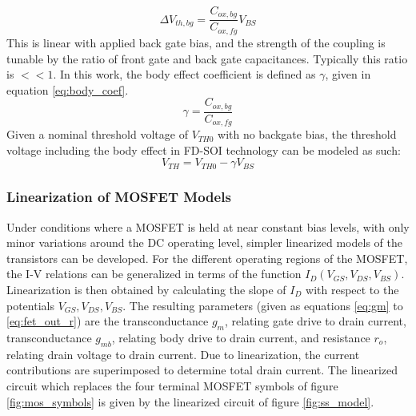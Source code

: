 	\begin{equation}
		\Delta V_{th,bg}= \frac{C_{ox,bg}}{C_{ox,fg}}V_{BS} 
	\end{equation}	
	This is linear with applied back gate bias, and the strength of the coupling is tunable by the ratio of front gate and back gate capacitances. Typically this ratio is $<<1$. In this work, the body effect coefficient is defined as $\gamma$, given in equation \ref{eq:body_coef}.
	\begin{equation}\label{eq:body_coef}
		\gamma = \frac{C_{ox,bg}}{C_{ox,fg}}
	\end{equation}
	Given a nominal threshold voltage of $V_{TH0}$ with no backgate bias, the threshold voltage including the body effect in FD-SOI technology can be modeled as such:
	\begin{equation}\label{eq:body_effect}
		V_{TH} = V_{TH0} - \gamma V_{BS}
	\end{equation}

	\subsubsection{Linearization of MOSFET Models}
	Under conditions where a MOSFET is held at near constant bias levels, with only minor variations around the DC operating level, simpler linearized models of the transistors can be developed. For the different operating regions of the MOSFET, the I-V relations can be generalized in terms of the function $I_D(V_{GS}, V_{DS}, V_{BS})$. Linearization is then obtained by calculating the slope of $I_D$ with respect to the potentials $V_{GS}, V_{DS}, V_{BS}$. The resulting parameters (given as equations \ref{eq:gm} to \ref{eq:fet_out_r}) are the transconductance $g_m$, relating gate drive to drain current, transconductance $g_{mb}$, relating body drive to drain current, and resistance $r_o$, relating drain voltage to drain current. Due to linearization, the current contributions are superimposed to determine total drain current. The linearized circuit which replaces the four terminal MOSFET symbols of figure \ref{fig:mos_symbols} is given by the linearized circuit of figure \ref{fig:ss_model}.

